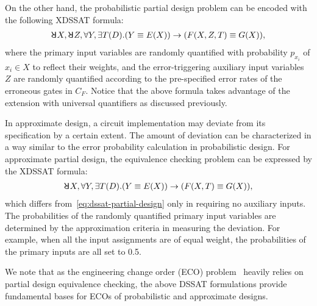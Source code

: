 On the other hand,
the probabilistic partial design problem can be encoded with the following XDSSAT formula:
\begin{align}
    \label{eq:dssat-partial-design}
    \random{} X,\random{} Z,\forall Y,\exists T(D).(Y \equiv E(X)) \limply (F(X,Z,T)\equiv G(X)),
\end{align}
where the primary input variables are randomly quantified with probability $p_{x_i}$ of $x_i \in X$ to reflect their weights,
and the error-triggering auxiliary input variables $Z$ are randomly quantified according to the pre-specified error rates of the erroneous gates in $C_F$.
Notice that the above formula takes advantage of the extension with universal quantifiers as discussed previously.

In approximate design,
a circuit implementation may deviate from its specification by a certain extent.
The amount of deviation can be characterized in a way similar to the error probability calculation in probabilistic design.
For approximate partial design,
the equivalence checking problem can be expressed by the XDSSAT formula:
\begin{align}
    \label{eq:dssat-approximate-design}
    \random{} X,\forall Y,\exists T(D).(Y \equiv E(X)) \limply (F(X,T)\equiv G(X)),
\end{align}
which differs from~\cref{eq:dssat-partial-design} only in requiring no auxiliary inputs.
The probabilities of the randomly quantified primary input variables are determined by the approximation criteria in measuring the deviation.
For example, when all the input assignments are of equal weight,
the probabilities of the primary inputs are all set to 0.5.

We note that as the engineering change order (ECO) problem~\cite{JiangDATE20ECOSurvey} heavily relies on partial design equivalence checking,
the above DSSAT formulations provide fundamental bases for ECOs of probabilistic and approximate designs.